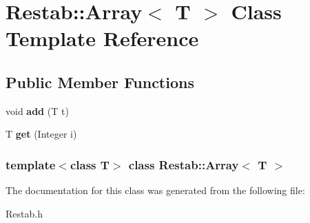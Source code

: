 \hypertarget{classRestab_1_1Array}{
\section{Restab::Array$<$ T $>$ Class Template Reference}
\label{classRestab_1_1Array}
}
\subsection*{Public Member Functions}
\begin{DoxyCompactItemize}
\item 
\hypertarget{classRestab_1_1Array_a53628d891f39d798b1c7f7d0ab2fde4f}{
void {\bfseries add} (T t)}
\label{classRestab_1_1Array_a53628d891f39d798b1c7f7d0ab2fde4f}

\item 
\hypertarget{classRestab_1_1Array_a6d744a9c92c6a8aa761fd46d40ae684e}{
T {\bfseries get} (Integer i)}
\label{classRestab_1_1Array_a6d744a9c92c6a8aa761fd46d40ae684e}

\end{DoxyCompactItemize}
\subsubsection*{template$<$class T$>$ class Restab::Array$<$ T $>$}



The documentation for this class was generated from the following file:\begin{DoxyCompactItemize}
\item 
Restab.h\end{DoxyCompactItemize}
